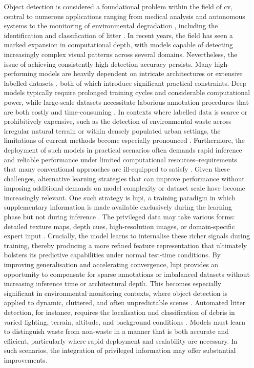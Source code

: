 Object detection is considered a foundational problem within the field of \gls{cv}, central to numerous applications ranging from medical analysis \cite{application_med1, application_med2} and autonomous systems \cite{application_automation1, application_automation2} to the monitoring of environmental degradation \cite{application_environment1, application_environment2}, including the identification and classification of litter \cite{taco2020, zerowaste}. In recent years, the field has seen a marked expansion in computational depth, with models capable of detecting increasingly complex visual patterns across several domains. Nevertheless, the issue of achieving consistently high detection accuracy persists. Many high-performing models are heavily dependent on intricate architectures \cite{detr, rt-detr} or extensive labelled datasets \cite{od_survey_problems}, both of which introduce significant practical constraints. Deep models typically require prolonged training cycles and considerable computational power, while large-scale datasets necessitate laborious annotation procedures that are both costly and time-consuming \cite{survey_od_problem}. In contexts where labelled data is scarce or prohibitively expensive, such as the detection of environmental waste across irregular natural terrain or within densely populated urban settings, the limitations of current methods become especially pronounced \cite{taco2020, soda_dataset}. Furthermore, the deployment of such models in practical scenarios often demands rapid inference and reliable performance under limited computational resources--requirements that many conventional approaches are ill-equipped to satisfy \cite{od_survey_problems}.
Given these challenges, alternative learning strategies that can improve performance without imposing additional demands on model complexity or dataset scale have become increasingly relevant. One such strategy is \gls{lupi}, a training paradigm in which supplementary information is made available exclusively during the learning phase but not during inference \cite{lupi}. The privileged data may take various forms: detailed texture maps, depth cues, high-resolution images, or domain-specific expert input \cite{lupi, lupi_classification, lupiv3}. Crucially, the model learns to internalise these richer signals during training, thereby producing a more refined feature representation that ultimately bolsters its predictive capabilities under normal test-time conditions. By improving generalisation and accelerating convergence, \gls{lupi} provides an opportunity to compensate for sparse annotations or imbalanced datasets without increasing inference time or architectural depth.
This becomes especially significant in environmental monitoring contexts, where object detection is applied to dynamic, cluttered, and often unpredictable scenes \cite{soda_dataset, bdwdataset}. Automated litter detection, for instance, requires the localisation and classification of debris in varied lighting, terrain, altitude, and background conditions \cite{soda_dataset, taco2020}. Models must learn to distinguish waste from non-waste in a manner that is both accurate and efficient, particularly where rapid deployment and scalability are necessary. In such scenarios, the integration of privileged information may offer substantial improvements.

